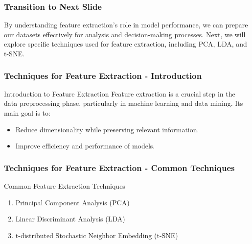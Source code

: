 \documentclass[aspectratio=169]{beamer}
\begin{document}
\begin{frame}[fragile]
    \frametitle{Transition to Next Slide}
    By understanding feature extraction's role in model performance, we can prepare our datasets effectively for analysis and decision-making processes. 
    Next, we will explore specific techniques used for feature extraction, including PCA, LDA, and t-SNE.
\end{frame}

\begin{frame}[fragile]
    \frametitle{Techniques for Feature Extraction - Introduction}
    \begin{block}{Introduction to Feature Extraction}
        Feature extraction is a crucial step in the data preprocessing phase, particularly in machine learning and data mining. Its main goal is to:
        \begin{itemize}
            \item Reduce dimensionality while preserving relevant information.
            \item Improve efficiency and performance of models.
        \end{itemize}
    \end{block}
\end{frame}

\begin{frame}[fragile]
    \frametitle{Techniques for Feature Extraction - Common Techniques}
    \begin{block}{Common Feature Extraction Techniques}
        \begin{enumerate}
            \item Principal Component Analysis (PCA)
            \item Linear Discriminant Analysis (LDA)
            \item t-distributed Stochastic Neighbor Embedding (t-SNE)
        \end{enumerate}
    \end{block}
\end{frame}
\end{document}
